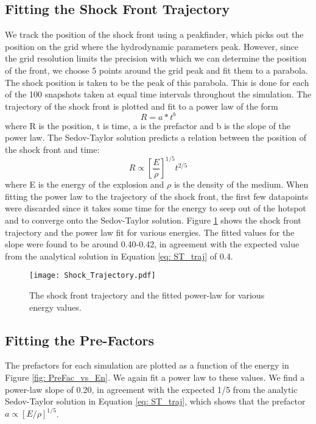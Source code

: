 \documentclass{article}
\begin{document}
\subsection{Fitting the Shock Front Trajectory}
We track the position of the shock front using a peakfinder, which picks out the position on the grid where the hydrodynamic parameters peak. However, since the grid resolution limits the precision with which we can determine the position of the front, we choose 5 points around the grid peak and fit them to a parabola. The shock position is taken to be the peak of this parabola. This is done for each of the 100 snapshots taken at equal time intervals throughout the simulation. The trajectory of the shock front is plotted and fit to a power law of the form
\begin{equation}
    R = a*t^b
\end{equation}
where R is the position, t is time, a is the prefactor and b is the slope of the power law. The Sedov-Taylor solution predicts a relation between the position of the shock front and time:
\begin{equation} \label{eq: ST_traj}
    R \propto \left[ \frac{E}{\rho} \right]^{1/5} t^{2/5}
\end{equation}
where E is the energy of the explosion and $\rho$ is the density of the medium. When fitting the power law to the trajectory of the shock front, the first few datapoints were discarded since it takes some time for the energy to seep out of the hotspot and to converge onto the Sedov-Taylor solution. Figure \ref{fig:Shock_Trajectory} shows the shock front trajectory and the power law fit for various energies. The fitted values for the slope were found to be around 0.40-0.42, in agreement with the expected value from the analytical solution in Equation \ref{eq: ST_traj} of 0.4.

\begin{figure}[ht!]
    \centering
    \texttt{[image: Shock\_Trajectory.pdf]}
    \caption{The shock front trajectory and the fitted power-law for various energy values.}
    \label{fig:Shock_Trajectory}
\end{figure}

\subsection{Fitting the Pre-Factors}
The prefactors for each simulation are plotted as a function of the energy in Figure \ref{fig: PreFac_vs_En}. We again fit a power law to these values. We find a power-law slope of 0.20, in agreement with the expected 1/5 from the analytic Sedov-Taylor solution in Equation \ref{eq: ST_traj}, which shows that the prefactor $a\propto [E/\rho]^{1/5}$. 
\end{document}
